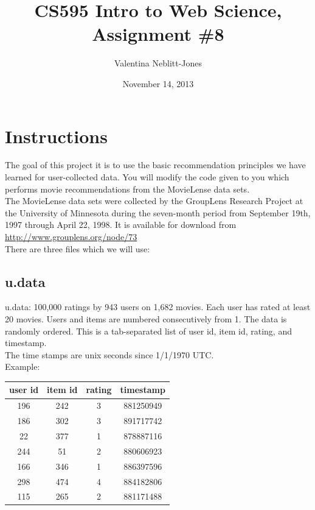 \documentclass{article}
\begin{document}
\title{CS595 Intro to Web Science, Assignment \#8}
\author{Valentina Neblitt-Jones}
\date{November 14, 2013}
\maketitle

\newpage
\listoftables
\lstlistoflistings
\listoffigures

\newpage
\section*{Instructions}

The goal of this project it is to use the basic recommendation principles we have learned for user-collected data. You will modify the code given to you which performs movie recommendations from the MovieLense data sets. \\

The MovieLense data sets were collected by the GroupLens Research Project at the University of Minnesota during the seven-month period from September 19th, 1997 through April 22, 1998. It is available for download from \url{http://www.grouplens.org/node/73} \\

There are three files which we will use: 

\subsection*{u.data}

u.data: 100,000 ratings by 943 users on 1,682 movies. Each user has rated at least 20 movies. Users and items are numbered consecutively from 1. The data is randomly ordered. This is a tab-separated list of user id, item id, rating, and timestamp. \\

The time stamps are unix seconds since 1/1/1970 UTC. \\

Example: 

\begin{table}[!h]
\centering
\begin{tabular}{c c c c}
user id & item id &  rating & timestamp \\
\hline
196 & 242 & 3 & 881250949 \\
186 & 302 & 3 & 891717742 \\
22 & 377 & 1 & 878887116 \\
244 & 51 & 2 & 880606923 \\
166 & 346 & 1 & 886397596 \\
298 & 474 & 4 & 884182806 \\
115 & 265 & 2 & 881171488 \\
\end{tabular}
\end{table}
\end{document}

